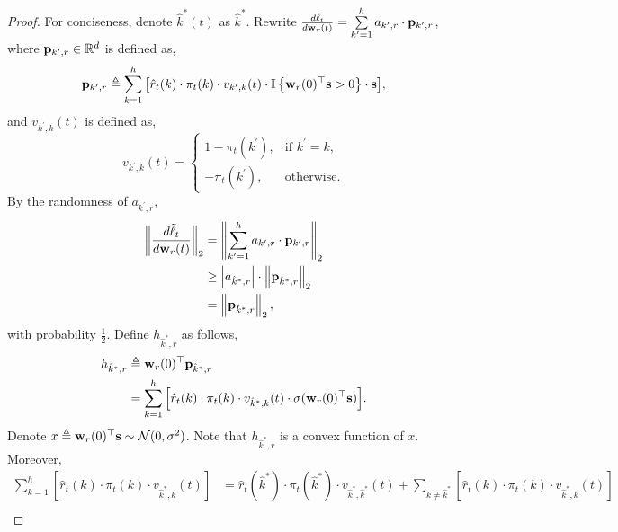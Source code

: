 \begin{proof}
	 For conciseness, denote $\hat{k}^*(t)$ as $\hat{k}^*$. Rewrite $\frac{d\tilde{\ell}_{t}}{d {\mathbf{w}}_r(t)} = \sum\limits_{k^
	\prime=1}^{h}{ a_{k^\prime,r} \cdot {\mathbf{p}}_{k^\prime, r} }$, where ${\mathbf{p}}_{k^\prime, r} \in {\mathbb{R}}^d$ is defined as, 
\begin{equation*}
	{\mathbf{p}}_{k^\prime, r} \triangleq \sum\limits_{k=1}^{h}{ \left[ \hat{r}_{t}(k) \cdot \pi_{t}(k) \cdot v_{k^\prime,k}(t) \cdot {\mathbb{I}}\left\{ {\mathbf{w}}_r(0)^\top {\mathbf{s}} > 0 \right\} \cdot {\mathbf{s}} \right] },
\end{equation*}
and $v_{k^\prime,k}(t)$ is defined as,
\begin{equation*}
	v_{k^\prime,k}(t) = \begin{cases}
    1 - \pi_{t}\left(k^\prime\right), & \text{if $k^\prime = k$}, \\
    - \pi_{t}\left(k^\prime\right), & \text{otherwise}.
  \end{cases}
\end{equation*}
By the randomness of $a_{k^\prime,r}$,
\begin{equation}
\label{eq:gradient_p_lowerbound}
\begin{split}
	\left\| \frac{d\tilde{\ell}_t}{d {\mathbf{w}}_r(t)} \right\|_2 &= \left\| \sum\limits_{k^
	\prime=1}^{h}{ a_{k^\prime,r} \cdot {\mathbf{p}}_{k^\prime, r} } \right\|_2 \\
	&\ge \left| a_{\hat{k}^*,r} \right| \cdot \left\| {\mathbf{p}}_{\hat{k}^*, r}\right\|_2 \\
	&= \left\| {\mathbf{p}}_{\hat{k}^*, r}\right\|_2,
\end{split}
\end{equation}
with probability $\frac{1}{2}$. Define $h_{\hat{k}^*,r}$ as follows,
\begin{equation}
\label{eq:h_auxiliary}
\begin{split}
	h_{\hat{k}^*,r} &\triangleq {\mathbf{w}}_r(0)^\top {\mathbf{p}}_{\hat{k}^*, r} \\
	&=  \sum\limits_{k=1}^{h}{ \left[ \hat{r}_{t}(k) \cdot \pi_{t}(k) \cdot v_{\hat{k}^*,k}(t) \cdot \sigma( {\mathbf{w}}_r(0)^\top {\mathbf{s}} ) \right] }.
\end{split}
\end{equation}
Denote $x \triangleq {\mathbf{w}}_r(0)^\top {\mathbf{s}} \sim {\mathcal{N}}(0, \sigma^2)$. Note that $h_{\hat{k}^*,r}$ is a convex function of $x$. Moreover,
\begin{equation*}
\begin{split}
	\sum\limits_{k=1}^{h}{ \left[ \hat{r}_{t}(k) \cdot \pi_{t}(k) \cdot v_{\hat{k}^*,k}(t) \right] } &= \hat{r}_{t}(\hat{k}^*) \cdot \pi_{t}(\hat{k}^*) \cdot v_{\hat{k}^*,\hat{k}^*}(t) + \sum\limits_{k\not=\hat{k}^*}{ \left[ \hat{r}_{t}(k) \cdot \pi_{t}(k) \cdot v_{\hat{k}^*,k}(t) \right] } \\

\end{split}
\end{equation*}
\end{proof}

